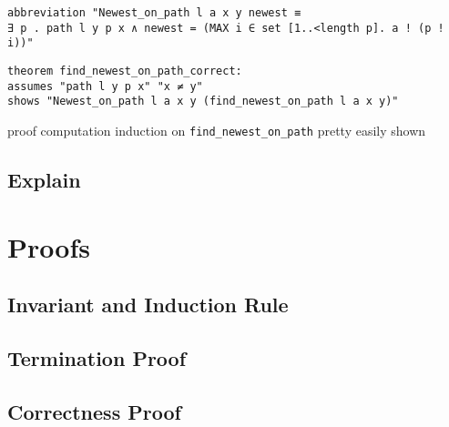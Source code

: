 \begin{lstlisting}
abbreviation "Newest_on_path l a x y newest ≡
∃ p . path l y p x ∧ newest = (MAX i ∈ set [1..<length p]. a ! (p ! i))"
\end{lstlisting}

\begin{lstlisting}
theorem find_newest_on_path_correct:
assumes "path l y p x" "x ≠ y"
shows "Newest_on_path l a x y (find_newest_on_path l a x y)"
\end{lstlisting}

proof
computation induction on \lstinline{find_newest_on_path}
pretty easily shown

\subsection{Explain}

\section{Proofs}

\subsection{Invariant and Induction Rule}

\subsection{Termination Proof}

\subsection{Correctness Proof}
